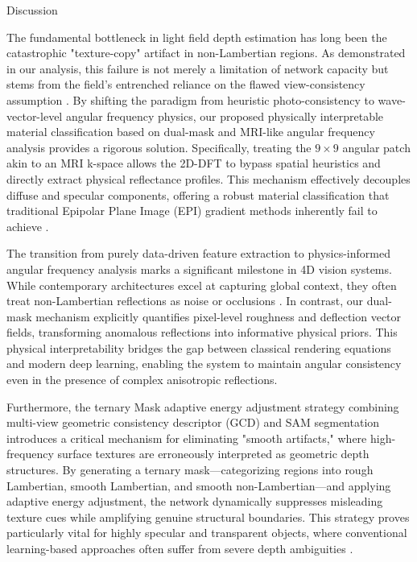 \documentclass[lettersize,journal]{IEEEtran}
\begin{document}
Discussion

The fundamental bottleneck in light field depth estimation has long been the catastrophic "texture-copy" artifact in non-Lambertian regions. As demonstrated in our analysis, this failure is not merely a limitation of network capacity but stems from the field's entrenched reliance on the flawed view-consistency assumption \cite{wanner2014, heber2018}. By shifting the paradigm from heuristic photo-consistency to wave-vector-level angular frequency physics, our proposed physically interpretable material classification based on dual-mask and MRI-like angular frequency analysis provides a rigorous solution. Specifically, treating the $9 \times 9$ angular patch akin to an MRI k-space allows the 2D-DFT to bypass spatial heuristics and directly extract physical reflectance profiles. This mechanism effectively decouples diffuse and specular components, offering a robust material classification that traditional Epipolar Plane Image (EPI) gradient methods inherently fail to achieve \cite{li2021}.

The transition from purely data-driven feature extraction to physics-informed angular frequency analysis marks a significant milestone in 4D vision systems. While contemporary architectures excel at capturing global context, they often treat non-Lambertian reflections as noise or occlusions \cite{liu2021}. In contrast, our dual-mask mechanism explicitly quantifies pixel-level roughness and deflection vector fields, transforming anomalous reflections into informative physical priors. This physical interpretability bridges the gap between classical rendering equations and modern deep learning, enabling the system to maintain angular consistency even in the presence of complex anisotropic reflections.

Furthermore, the ternary Mask adaptive energy adjustment strategy combining multi-view geometric consistency descriptor (GCD) and SAM segmentation introduces a critical mechanism for eliminating "smooth artifacts," where high-frequency surface textures are erroneously interpreted as geometric depth structures. By generating a ternary mask—categorizing regions into rough Lambertian, smooth Lambertian, and smooth non-Lambertian—and applying adaptive energy adjustment, the network dynamically suppresses misleading texture cues while amplifying genuine structural boundaries. This strategy proves particularly vital for highly specular and transparent objects, where conventional learning-based approaches often suffer from severe depth ambiguities \cite{kirillov2023, zhang2023}. 
\end{document}
